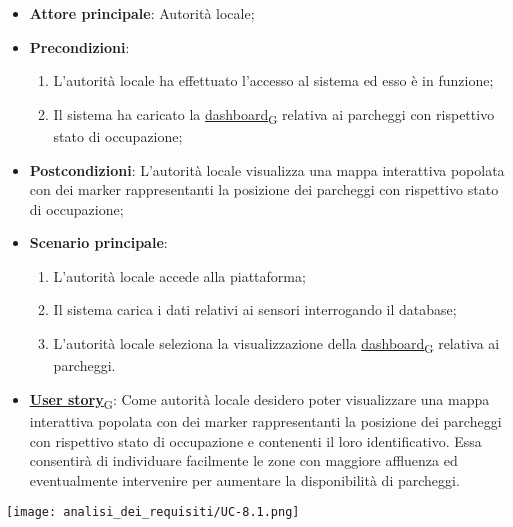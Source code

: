\begin{itemize}
	\item \textbf{Attore principale}: Autorità locale;
	\item \textbf{Precondizioni}:
	      \begin{enumerate}
		      \item L'autorità locale ha effettuato l'accesso al sistema ed esso è in funzione;
		      \item Il sistema ha caricato la \href{https://7last.github.io/docs/rtb/documentazione-interna/glossario\#dashboard}{dashboard\textsubscript{G}} relativa ai parcheggi con rispettivo stato di occupazione;
	      \end{enumerate}
	\item \textbf{Postcondizioni}: L'autorità locale visualizza una mappa interattiva popolata con dei marker rappresentanti la posizione dei parcheggi con rispettivo stato di occupazione;
	\item \textbf{Scenario principale}:
	      \begin{enumerate}
		      \item L'autorità locale accede alla piattaforma;
		      \item Il sistema carica i dati relativi ai sensori interrogando il database;
		      \item L'autorità locale seleziona la visualizzazione della \href{https://7last.github.io/docs/rtb/documentazione-interna/glossario\#dashboard}{dashboard\textsubscript{G}} relativa ai parcheggi.
	      \end{enumerate}
	\item \href{https://7last.github.io/docs/rtb/documentazione-interna/glossario\#user-story}{\textbf{User story}\textsubscript{G}}:
	      Come autorità locale desidero poter visualizzare una mappa interattiva popolata con dei marker rappresentanti la posizione dei parcheggi con rispettivo stato di occupazione
	      e contenenti il loro identificativo. Essa consentirà di individuare facilmente le zone con maggiore affluenza ed eventualmente intervenire per aumentare la disponibilità di parcheggi.
\end{itemize}
\begin{center}
	\texttt{[image: analisi\_dei\_requisiti/UC-8.1.png]}
\end{center}

